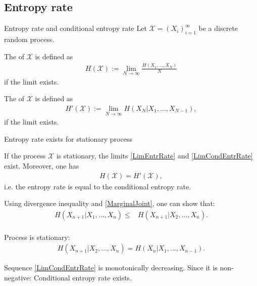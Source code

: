 \subsection{Entropy rate}
\begin{frame}{Entropy rate and conditional entropy rate}
Let $\mathcal{X}=\left(X_i\right)_{i=1}^\infty$ be a discrete random process.
\bit
\item The   of $\mathcal{X}$ is 
defined as 
\begin{align}\label{LimEntrRate}
H(\mathcal{X}):=\lim_{N\to\infty}\frac{H\left(X_1,\dots,X_N\right)}{N}
\end{align}
if the limit exists.
\item The  of $\mathcal{X}$ is 
defined as 
\begin{align}\label{LimCondEntrRate}
H'(\mathcal{X}):=\lim_{N\to\infty}H\left(X_N|X_1,\dots,X_{N-1}\right),
\end{align}
if the limit exists.
\eit
\end{frame}

\begin{frame}{Entropy rate exists for stationary process}
\begin{theorem}
If the process $\mathcal{X}$ is stationary, the limits \eqref{LimEntrRate} and \eqref{LimCondEntrRate} exist. Moreover, one has
\begin{align*}
H(\mathcal{X})=H'(\mathcal{X}),
\end{align*}
i.e. the entropy rate is equal to the conditional entropy rate.
\end{theorem}
\bit
\item Using divergence inequality and \eqref{MarginalJoint}, one can show that: 
\begin{align*}
H(X_{n+1}|X_1,\dots,X_n)\leq &H(X_{n+1}|X_2,\dots,X_{n}).\\
\end{align*}
\item Process is stationary: 
\begin{align*}
H(X_{n+1}|X_2,\dots,X_{n})=H(X_{n}|X_1,\dots,X_{n-1}).
\end{align*}
\item [\iarrow] Sequence \eqref{LimCondEntrRate} is monotonically decreasing. Since it is non-negative: Conditional entropy rate exists. 
\eit
\end{frame}


